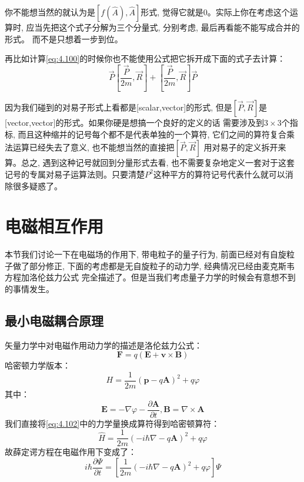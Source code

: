 \documentclass[a4paper,zihao=-4,linespread=1]{ctexrep}
\begin{document}
    你不能想当然的就认为是$\left[f(\hat{A}),\hat{A}\right]$形式, 觉得它就是$0$。实际上你在考虑这个运算时, 应当先把这个式子分解为三个分量式, 分别考虑, 最后再看能不能写成合并的形式。
    而不是只想着一步到位。
    
    再比如计算\ref{eq:4.100}的时候你也不能使用公式把它拆开成下面的式子去计算：
    \[\vec{P}\left[\frac{\vec{P}}{2m},\vec{R}\right]+\left[\frac{\vec{P}}{2m},\vec{R}\right]\vec{P}\]
    
    因为我们碰到的对易子形式上看都是[scalar,vector]的形式, 但是$[\vec{P},\vec{R}]$是[vector,vector]的形式。如果你硬是想搞一个良好的定义的话
    需要涉及到$3\times 3$个指标, 而且这种缩并的记号每个都不是代表单独的一个算符, 它们之间的算符复合乘法运算已经失去了意义, 也不能想当然的直接把$[\vec{P},\vec{R}]$
    用对易子的定义拆开来算。总之, 遇到这种记号就回到分量形式去看, 也不需要复杂地定义一套对于这套记号的专属对易子运算法则。只要清楚$P^2$这种平方的算符记号代表什么就可以消除很多疑惑了。


    \section{电磁相互作用}
    本节我们讨论一下在电磁场的作用下, 带电粒子的量子行为, 前面已经对有自旋粒子做了部分修正, 下面的考虑都是无自旋粒子的动力学, 经典情况已经由麦克斯韦方程加洛伦兹力公式
    完全描述了。但是当我们考虑量子力学的时候会有意想不到的事情发生。

    \subsection*{最小电磁耦合原理}
    矢量力学中对电磁作用动力学的描述是洛伦兹力公式：
    \begin{equation}
        \mathbf{F}=q\left(\mathbf{E}+\mathbf{v}\times\mathbf{B}\right)
    \end{equation}
    哈密顿力学版本：
    \begin{equation}
        \label{eq:4.102}
        H=\frac{1}{2m}\left(\mathbf{p}-q\mathbf{A}\right)^2+q\varphi
    \end{equation}
    其中：
    \begin{equation}
        \mathbf{E}=-\nabla\varphi-\frac{\partial\mathbf{A}}{\partial t},\mathbf{B}=\nabla\times \mathbf{A}
    \end{equation}
    我们直接将\ref{eq:4.102}中的力学量换成算符得到哈密顿算符：
    \begin{equation}
        \hat{H}=\frac{1}{2m}\left(-i\hbar\nabla-q\mathbf{A}\right)^2+q\varphi
    \end{equation}
    故薛定谔方程在电磁作用下变成了：
    \begin{equation}
        \label{eq:4.105}
        \boxed{
            i\hbar\frac{\partial\Psi}{\partial t}=\left[\frac{1}{2m}\left(-i\hbar\nabla-q\mathbf{A}\right)^2+q\varphi\right]\Psi
        }
    \end{equation}
\end{document}
